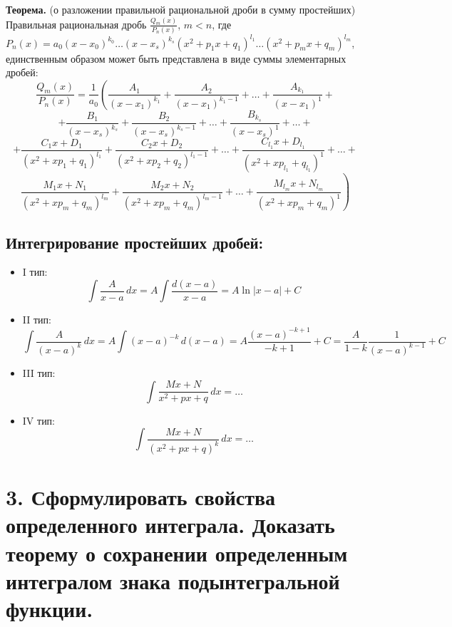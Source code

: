 \documentclass[11pt]{article}
\begin{document}
\par
\textbf{Теорема.} (о разложении правильной рациональной дроби в сумму простейших)
Правильная рациональная дробь {\Large \(\frac{Q_m(x)}{P_n(x)}\)}, \(m < n\),
где \(P_n(x) = a_{0}(x - x_{0})^{k_{0}} \dots (x - x_{s})^{k_{s}}(x^2 + p_{1}x + q_{1})^{l_{1}} \dots (x^2 + p_{m}x + q_{m})^{l_{m}}\),
единственным образом может быть представлена в виде суммы элементарных дробей:
\[\frac{Q_m(x)}{P_n(x)} = \frac{1}{a_{0}} \left( \frac{A_{1}}{(x - x_{1})^{k_{1}}} + \frac{A_{2}}{(x - x_{1})^{k_{1}-1}} + \dots + \frac{A_{k_{1}}}{(x - x_{1})^{1}} + \right.\]
\[+ \frac{B_{1}}{(x - x_{s})^{k_{s}}} + \frac{B_{2}}{(x - x_{s})^{k_{s}-1}} + \dots + \frac{B_{k_{s}}}{(x - x_{s})^{1}} + \dots  +\]
\[+ \frac{C_{1}x + D_{1}}{(x^2 + xp_{1} + q_{1})^{l_{1}}} + \frac{C_{2}x + D_{2}}{(x^2 + xp_{2} + q_{2})^{l_{1}-1}} + \dots + \frac{C_{l_{1}}x + D_{l_{1}}}{(x^2 + xp_{l_{1}} + q_{l_{1}})^{1}} + \dots + \]
\[\left. \frac{M_{1}x + N_{1}}{(x^2 + xp_{m} + q_{m})^{l_{m}}} + \frac{M_{2}x + N_{2}}{(x^2 + xp_{m} + q_{m})^{l_{m}-1}} + \dots + \frac{M_{l_{m}}x + N_{l_{m}}}{(x^2 + xp_{m} + q_{m})^{1}} \right)\]
\subsection*{Интегрирование простейших дробей:}
\begin{itemize}
\item I тип:
\[\int \frac{A}{x - a} \, dx = A \int \frac{d(x - a)}{x - a} = A \ln |x - a| + C\]
\item II тип: \[\int \frac{A}{(x - a)^k} \, dx = A \int (x - a)^{-k} \, d(x - a) = A \frac{{(x - a)^{-k+1}}}{-k + 1} + C = \frac{A}{1 - k} \frac{1}{(x-a)^{k-1}} + C\]
\item III тип: \[\int \frac{{Mx + N}}{x^2 + px + q} \, dx = \dots\]
\item IV тип: \[\int \frac{{Mx + N}}{(x^2 + px + q)^k} \, dx = \dots\]
\end{itemize}

\section*{3. Сформулировать свойства определенного интеграла. Доказать теорему о сохранении определенным интегралом знака подынтегральной функции.}
\end{document}
